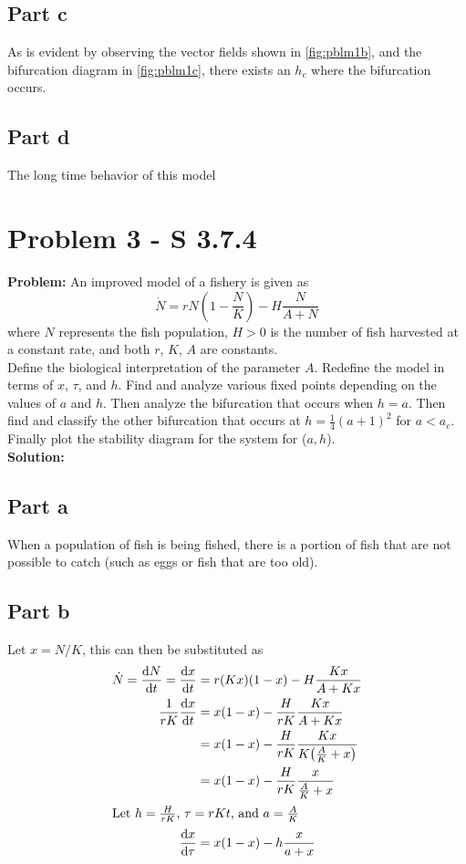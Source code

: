 \documentclass[letter]{article}
\begin{document}
\subsection{Part c}
As is evident by observing the vector fields shown in \ref{fig:pblm1b}, and the bifurcation diagram in \ref{fig:pblm1c}, there exists an $h_c$ where the bifurcation occurs.


\subsection{Part d}
The long time behavior of this model 




\newpage
\section{Problem 3 - S 3.7.4}
\textbf{Problem:}
An improved model of a fishery is given as
\begin{equation}
	\dot{N} = r N (1 - \frac{N}{K}) - H \frac{N}{A + N}
\end{equation}
where $N$ represents the fish population, $H > 0$ is the number of fish harvested at a constant rate, and both $r$, $K$, $A$ are constants.\\
Define the biological interpretation of the parameter $A$. Redefine the model in terms of $x$, $\tau$, and $h$. Find and analyze various fixed points depending on the values of $a$ and $h$. Then analyze the bifurcation that occurs when $h=a$. Then find and classify the other bifurcation that occurs at $h = \frac{1}{4} (a+1)^2$ for $a<a_c$. Finally plot the stability diagram for the system for ($a,h$).\\

\noindent
\textbf{Solution:}
\subsection{Part a}
When a population of fish is being fished, there is a portion of fish that are not possible to catch (such as eggs or fish that are too old).

\subsection{Part b}
Let $x = N / K$, this can then be substituted as
\begin{align}
	\dot{N} = \dv{N}{t} = \dv{x}{t}	
	&= r (K x) \qty(1 - x) - H\frac{K x}{A + K x}\\
	\frac{1}{r K} \dv{x}{t}
	&= x \qty(1 - x) - \frac{H}{r K}\frac{K x}{A + K x}\\
	&= x \qty(1 - x) - \frac{H}{r K}\frac{K x}{K\qty(\frac{A}{K} + x)}\\
	&= x \qty(1 - x) - \frac{H}{r K}\frac{x}{\frac{A}{K} + x}\\
	\intertext{Let $h = \frac{H}{r K}$, $\tau = r K t$, and $a = \frac{A}{K}$}
	\dv{x}{\tau} &= x (1 - x) - h \frac{x}{a + x}
\end{align}
\end{document}
